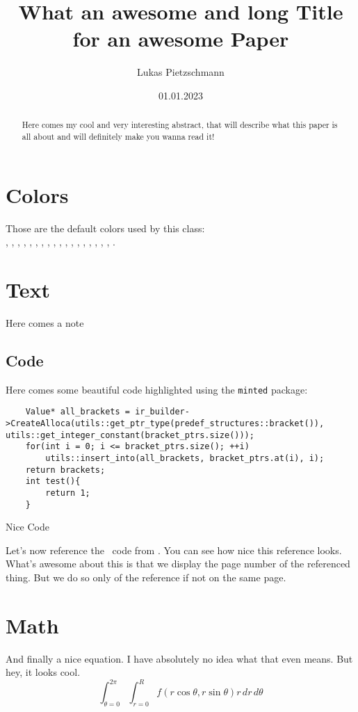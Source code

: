 \documentclass[english, awesomeminted, wideabstract=false]{report}
\title{What an awesome and long Title for an awesome Paper}
\author{Lukas Pietzschmann}
\institute{Institute of Software Engineering and Programming Languages}
\date{01.01.2023}
\begin{document}
\maketitle

\begin{abstract}
	Here comes my cool and very interesting abstract, that will describe what this paper is all about
	and will definitely make you wanna read it!
	\lipsum[1]
\end{abstract}

\section{Colors}
Those are the default colors used by this class:\\
, , , , , ,
, , , , , ,
, , , , , , .

\section{Text}
\lipsum[1-3]
Here comes a note
\lipsum[1]

\subsection{Code}
Here comes some beautiful code highlighted using the \texttt{minted} package:
\begin{listing}[H]
\begin{verbatim}
	Value* all_brackets = ir_builder->CreateAlloca(utils::get_ptr_type(predef_structures::bracket()), utils::get_integer_constant(bracket_ptrs.size()));
	for(int i = 0; i <= bracket_ptrs.size(); ++i)
		utils::insert_into(all_brackets, bracket_ptrs.at(i), i);
	return brackets;
	int test(){
		return 1;
	}
\end{verbatim}
\caption{Nice Code}
\label{lst:test}
\end{listing}
\lipsum[1-4]\par
Let's now reference the \cpp~code from . You can see how nice this reference looks. What's awesome about this is that we display the page
number of the referenced thing. But we do so only of the reference if not on the same page.

\section{Math}
And finally a nice equation. I have absolutely no idea what that even means. But hey, it looks cool.
\begin{equation}
	\int_{\theta=0}^{2\pi} \int_{r=0}^R
	f(r\cos\theta,r\sin\theta) r\,dr\,d\theta
\end{equation}
\lipsum[1]
\end{document}
